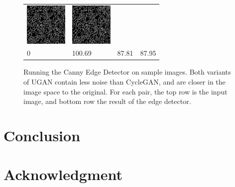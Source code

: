 \documentclass[conference,reqno]{IEEEtran}
\begin{document}
\begin{figure}
\begin{tabular}{p{1.7cm} p{1.7cm} p{1.7cm} p{1.5cm}}
   \includegraphics[width=0.8in]{n02607072_4739_u0edges} &
   \includegraphics[width=0.8in]{n02607072_4739_u1edges} \\
   0 & \small{100.69} & \small{87.81} & \small{87.95} \\
   
\end{tabular}
\caption{Running the Canny Edge Detector on sample images. Both variants of UGAN contain less noise than CycleGAN,
and are closer in the image space to the original. For each pair, the top row is the input image, and bottom row
the result of the edge detector.}
\end{figure}


\section{Conclusion}



\section*{Acknowledgment}

%
%


\end{document}
